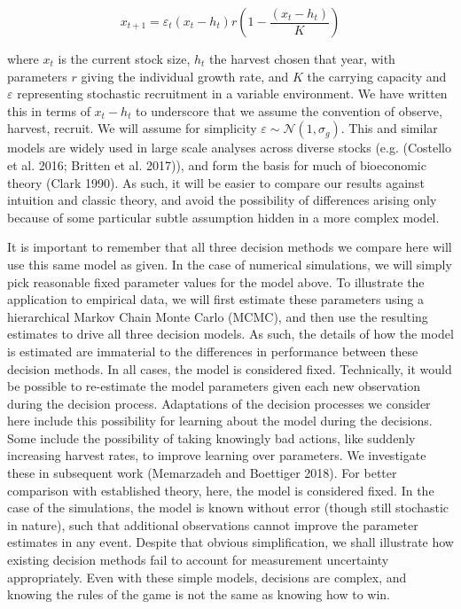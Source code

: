\documentclass[3p]{elsarticle} %
\begin{document}
\begin{equation}
x_{t+1} = \varepsilon_t (x_t-h_t) r  \left(1 - \frac{(x_t-h_t)}{K}\right) \label{Gordon-Schaefer}
\end{equation}

where \(x_t\) is the current stock size, \(h_t\) the harvest chosen that
year, with parameters \(r\) giving the individual growth rate, and \(K\)
the carrying capacity and \(\varepsilon\) representing stochastic
recruitment in a variable environment. We have written this in terms of
\(x_t - h_t\) to underscore that we assume the convention of observe,
harvest, recruit. We will assume for simplicity
\(\varepsilon \sim \mathcal{N}(1, \sigma_g)\). This and similar models
are widely used in large scale analyses across diverse stocks (e.g.
(Costello et al. 2016; Britten et al. 2017)), and form the basis for
much of bioeconomic theory (Clark 1990). As such, it will be easier to
compare our results against intuition and classic theory, and avoid the
possibility of differences arising only because of some particular
subtle assumption hidden in a more complex model.

It is important to remember that all three decision methods we compare
here will use this same model as given. In the case of numerical
simulations, we will simply pick reasonable fixed parameter values for
the model above. To illustrate the application to empirical data, we
will first estimate these parameters using a hierarchical Markov Chain
Monte Carlo (MCMC), and then use the resulting estimates to drive all
three decision models. As such, the details of how the model is
estimated are immaterial to the differences in performance between these
decision methods. In all cases, the model is considered fixed.
Technically, it would be possible to re-estimate the model parameters
given each new observation during the decision process. Adaptations of
the decision processes we consider here include this possibility for
learning about the model during the decisions. Some include the
possibility of taking knowingly bad actions, like suddenly increasing
harvest rates, to improve learning over parameters. We investigate these
in subsequent work (Memarzadeh and Boettiger 2018). For better
comparison with established theory, here, the model is considered fixed.
In the case of the simulations, the model is known without error (though
still stochastic in nature), such that additional observations cannot
improve the parameter estimates in any event. Despite that obvious
simplification, we shall illustrate how existing decision methods fail
to account for measurement uncertainty appropriately. Even with these
simple models, decisions are complex, and knowing the rules of the game
is not the same as knowing how to win.
\end{document}

